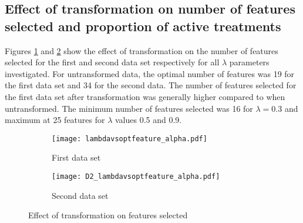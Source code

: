 \documentclass[11pt]{article}
\begin{document}

\clearpage
\subsection{Effect of transformation on number of features selected and proportion of active treatments}
\par{Figures \ref{featselectdata1} and \ref{featselectdata2} show the effect of transformation on the number of features selected for the first and second data set respectively for all $\lambda$ parameters investigated. For untransformed data, the optimal number of features was 19 for the first data set and 34 for the second data. The number of features selected for the first data set after transformation was generally higher compared to when untransformed. The minimum number of features selected was 16 for $\lambda = 0.3 $ and maximum at 25 features for $\lambda$ values 0.5 and 0.9.}
\begin{figure}[!ht] 
\centering
  \begin{subfigure}{0.55\textwidth}
    \centering
    \texttt{[image: lambdavsoptfeature\_alpha.pdf]} 
\caption{First data set}
  \label{featselectdata1}
  \end{subfigure}%
  \begin{subfigure}{0.55\textwidth}
    \centering
    \texttt{[image: D2\_lambdavsoptfeature\_alpha.pdf]} 
    \caption[Second data set]{Second data set} 
    \label{featselectdata2} 
    \vspace{0ex}
  \end{subfigure} 
\caption[Effect of transformation on number of selected features]{Effect of transformation on features selected}
  \label{featselectdata} 
\end{figure}
\end{document}
